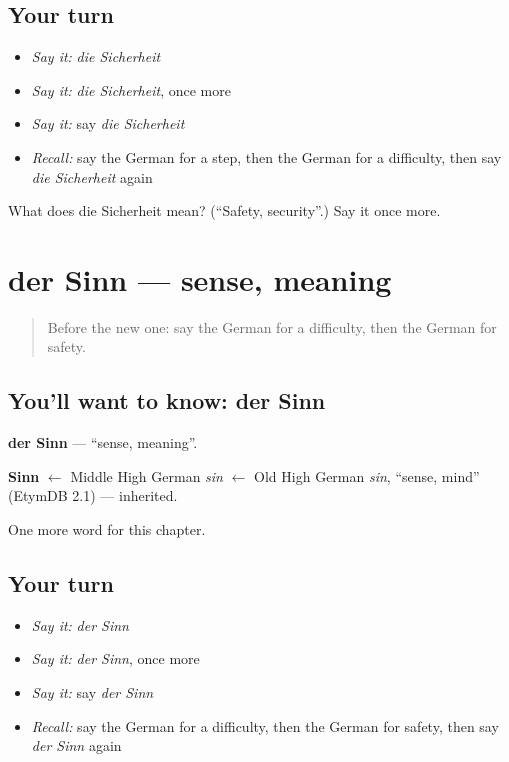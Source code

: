 \subsection*{Your turn}
\begin{itemize}
\raggedright
  \item \emph{Say it:} \emph{die Sicherheit}
  \item \emph{Say it:} \emph{die Sicherheit}, once more
  \item \emph{Say it:} say \emph{die Sicherheit}
  \item \emph{Recall:} say the German for a step, then the German for a difficulty, then say \emph{die Sicherheit} again
\end{itemize}

\begin{tcolorbox}[breakable,colback=teal!4,colframe=teal!35!black,title={Before you move on}]
What does die Sicherheit mean? (\textquotedblleft{}Safety, security\textquotedblright{}.) Say it once more.
\end{tcolorbox}
\section[der Sinn]{der Sinn — sense, meaning}

\label{lesson:GE-C238-sinn}



\begin{quote}
Before the new one: say the German for a difficulty, then the German for safety.
\end{quote}

\subsection*{You'll want to know: der Sinn}
\textbf{der Sinn} — \textquotedblleft{}sense, meaning\textquotedblright{}.

\begin{cousinweb}
\textbf{Sinn} $\leftarrow$ Middle High German \emph{sin} $\leftarrow$ Old High German \emph{sin}, \textquotedblleft{}sense, mind\textquotedblright{} (EtymDB 2.1) — inherited.
\end{cousinweb}

\begin{grammarlens}[title={What you've built}]
One more word for this chapter.
\end{grammarlens}

\subsection*{Your turn}
\begin{itemize}
\raggedright
  \item \emph{Say it:} \emph{der Sinn}
  \item \emph{Say it:} \emph{der Sinn}, once more
  \item \emph{Say it:} say \emph{der Sinn}
  \item \emph{Recall:} say the German for a difficulty, then the German for safety, then say \emph{der Sinn} again
\end{itemize}

